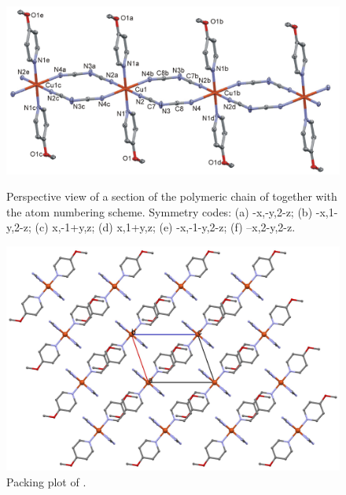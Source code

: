 \begin{figure}[!htpb]
\centering
\includegraphics[width=1\textwidth]{figures/cudmop_FIGm11-1.png}
\caption[Perspective view of ] {Perspective view of a section of the polymeric chain of  together with the atom numbering scheme. Symmetry codes: (a) -x,-y,2-z; (b) -x,1-y,2-z; (c) x,-1+y,z; (d) x,1+y,z; (e) -x,-1-y,2-z; (f) –x,2-y,2-z.}
\label{fig:CuD4MOP_pv}
\vspace{\floatsep}
\includegraphics[width=1\textwidth]{figures/cudmop_CB-1.png}
\caption{Packing plot  of .}
\label{fig:CuD4MOP_packv}
\end{figure}


